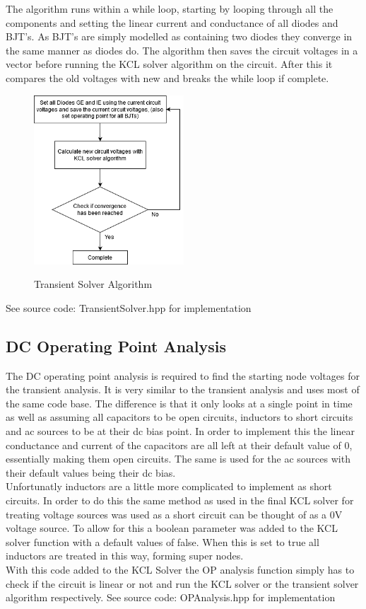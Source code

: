 \documentclass{article}
\begin{document}
The algorithm runs within a while loop, starting by looping through all the components and setting the linear current and conductance of all diodes and BJT's. As BJT's are simply modelled as containing two diodes they converge in the same manner as diodes do. The algorithm then saves the circuit voltages in a vector before running the KCL solver algorithm on the circuit. After this it compares the old voltages with new and breaks the while loop if complete.  

\begin{figure}[h]
    \caption{Transient Solver Algorithm}
    \centering
    \includegraphics[width=0.5\textwidth]{images/TransientSolverAlgorithm.png}
    \label{fig:transient}
\end{figure}
\bigbreak
See source code: TransientSolver.hpp for implementation 
\newpage

\subsection{DC Operating Point Analysis}\label{ssec:DCanalysis}
The DC operating point analysis is required to find the starting node voltages for the transient analysis. It is very similar to the transient analysis and uses most of the same code base. The difference is that it only looks at a single point in time as well as assuming all capacitors to be open circuits, inductors to short circuits and ac sources to be at their dc bias point. In order to implement this the linear conductance and current of the capacitors are all left at their default value of 0, essentially making them open circuits. The same is used for the ac sources with their default values being their dc bias.\\Unfortunatly inductors are a little more complicated to implement as short circuits. In order to do this the same method as used in the final KCL solver for treating voltage sources was used as a short circuit can be thought of as a 0V voltage source. To allow for this a boolean parameter was added to the KCL solver function with a default values of false. When this is set to true all inductors are treated in this way, forming super nodes.\\
With this code added to the KCL Solver the OP analysis function simply has to check if the circuit is linear or not and run the KCL solver or the transient solver algorithm respectively. 
\bigbreak
See source code: OPAnalysis.hpp for implementation 
\newpage
\end{document}
